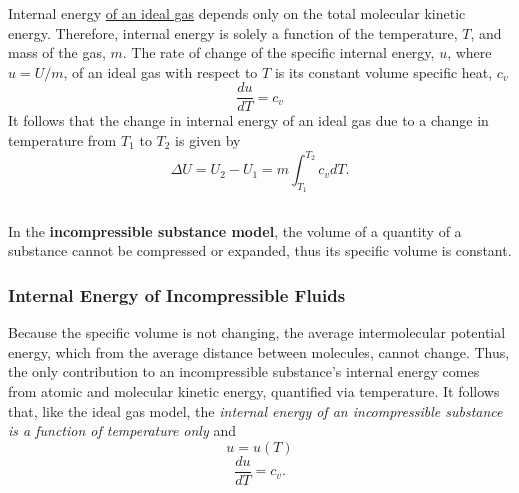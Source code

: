 Internal energy \underline{of an ideal gas} depends only on the total molecular kinetic energy.  Therefore, internal energy is solely a function of the temperature, $T$, and mass of the gas, $m$. The rate of change of the specific internal energy, $u$, where $u = U/m$, of an ideal gas with respect to $T$ is its constant volume specific heat, $c_v$
\begin{equation}
\frac{du}{dT} = c_v
\end{equation}
It follows that the change in internal energy of an ideal gas due to a change in temperature from $T_1$ to $T_2$ is given by
\begin{equation}
\Delta U = U_2 - U_1 = m\int_{T_1}^{T_2} c_v dT.
\end{equation}
\subsection{}
In the \textbf{incompressible substance model}, the volume of a quantity of a substance cannot be compressed or expanded, thus its specific volume is constant. \subsubsection{Internal Energy of Incompressible Fluids}
Because the specific volume is not changing, the average intermolecular potential energy, which from the average distance between molecules, cannot change. Thus, the only contribution to an incompressible substance's internal energy comes from atomic and molecular kinetic energy, quantified via temperature. It follows that, like the ideal gas model, the \emph{internal energy of an incompressible substance is a function of temperature only} and 
    \begin{equation*}
        u = u(T)
    \end{equation*}
    \begin{equation*}
        \label{eqn:cvDefinition}
        \frac{du}{dT} = c_v.
    \end{equation*}
